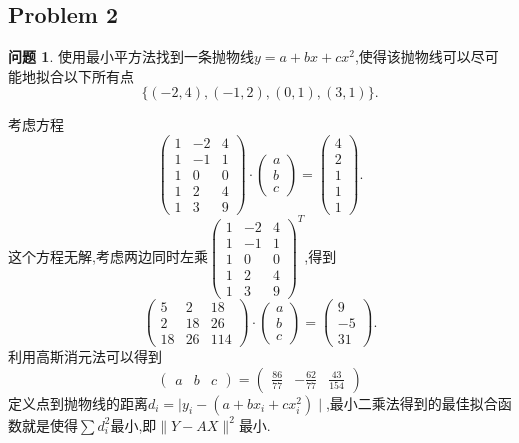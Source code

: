 \documentclass[11pt]{ctexart}
\theoremstyle{definition}
\newtheorem{qqq}{问题}[section]
\numberwithin{equation}{section}
\begin{document}
\subsection{Problem 2}
\begin{qqq}
    使用最小平方法找到一条抛物线$y=a+bx+cx^2$,使得该抛物线可以尽可能地拟合以下所有点
    \[\{(-2,4),(-1,2),(0,1),(3,1)\}.\]
\end{qqq}
\begin{aaa}
    考虑方程\[\begin{pmatrix}
        1 &-2 &4\\1&-1&1\\1&0&0\\1&2&4\\1&3&9
    \end{pmatrix}\cdot\begin{pmatrix}
        a\\b\\c
    \end{pmatrix}=\begin{pmatrix}
        4\\2\\1\\1\\1
    \end{pmatrix}.\]
    这个方程无解,考虑两边同时左乘$\begin{pmatrix}
        1 &-2 &4\\1&-1&1\\1&0&0\\1&2&4\\1&3&9
    \end{pmatrix}^T$,得到
    \[\begin{pmatrix}
        5&2&18\\2&18&26\\18&26&114
    \end{pmatrix}\cdot\begin{pmatrix}
        a\\b\\c
    \end{pmatrix}=\begin{pmatrix}
        9\\-5\\31
    \end{pmatrix}.\]
    利用高斯消元法可以得到\[\begin{pmatrix}
        a&b&c
    \end{pmatrix}=\begin{pmatrix}
        \frac{86}{77}&-\frac{62}{77}&\frac{43}{154}
    \end{pmatrix}\]
    \newline
    定义点到抛物线的距离$d_i=\mid y_i-(a+bx_i+cx_i^2)\mid$,最小二乘法得到的最佳拟合函数就是使得$\sum d_i^2$最小,即$\| Y-AX\|^2$最小.
\end{aaa}
\end{document}
